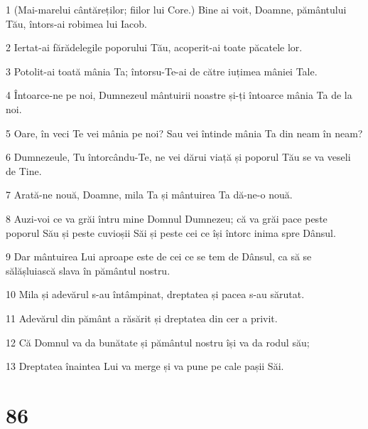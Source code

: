 \par 1 (Mai-marelui cântăreților; fiilor lui Core.) Bine ai voit, Doamne, pământului Tău, întors-ai robimea lui Iacob.
\par 2 Iertat-ai fărădelegile poporului Tău, acoperit-ai toate păcatele lor.
\par 3 Potolit-ai toată mânia Ta; întorsu-Te-ai de către iuțimea mâniei Tale.
\par 4 Întoarce-ne pe noi, Dumnezeul mântuirii noastre și-ți întoarce mânia Ta de la noi.
\par 5 Oare, în veci Te vei mânia pe noi? Sau vei întinde mânia Ta din neam în neam?
\par 6 Dumnezeule, Tu întorcându-Te, ne vei dărui viață și poporul Tău se va veseli de Tine.
\par 7 Arată-ne nouă, Doamne, mila Ta și mântuirea Ta dă-ne-o nouă.
\par 8 Auzi-voi ce va grăi întru mine Domnul Dumnezeu; că va grăi pace peste poporul Său și peste cuvioșii Săi și peste cei ce își întorc inima spre Dânsul.
\par 9 Dar mântuirea Lui aproape este de cei ce se tem de Dânsul, ca să se sălășluiască slava în pământul nostru.
\par 10 Mila și adevărul s-au întâmpinat, dreptatea și pacea s-au sărutat.
\par 11 Adevărul din pământ a răsărit și dreptatea din cer a privit.
\par 12 Că Domnul va da bunătate și pământul nostru își va da rodul său;
\par 13 Dreptatea înaintea Lui va merge și va pune pe cale pașii Săi.

\chapter{86}

